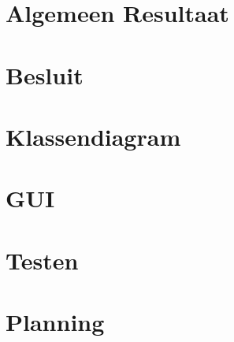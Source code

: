 \documentclass[eind]{penoverslag}
\begin{document}
\section*{Algemeen Resultaat}
\label{sec:AlgemeenResultaat}



\section*{Besluit}
\label{sec:Besluit}






\newpage\makeappendix

\section{Klassendiagram}
\label{App: AppendixKlassendiagram}

\newpage
\section{GUI}
\label{App: AppendixGUI}

\newpage
\section{Testen}
\label{App: AppendixTesten}

\section{Planning}
\label{App: AppendixPlanning}

%
\end{document}
